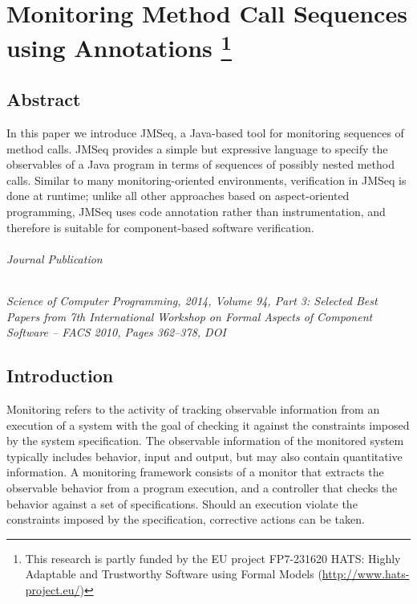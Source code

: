 
\chapter[Monitoring Method Call Sequences using Annotations]{Monitoring Method Call Sequences using Annotations%
\footnote{This research is partly funded by the EU project FP7-231620 HATS: Highly Adaptable and Trustworthy Software using Formal Models (\url{http://www.hats-project.eu/})}
}
% 
\label{ch:p03:ch02}
% 
% 

\section*{Abstract}
In this paper we introduce JMSeq, a Java-based tool for 
monitoring  sequences of
method calls. JMSeq provides a simple but expressive language
to specify the observables of  a Java program in terms of sequences of possibly nested method calls. 
Similar to many
monitoring-oriented environments, verification in JMSeq is done
at runtime; unlike all other approaches based on
aspect-oriented programming, JMSeq uses code
annotation rather than instrumentation,
and therefore is suitable for component-based software verification.

\subparagraph*{Journal Publication}
\emph{Science of Computer Programming, 2014, Volume 94, Part 3: Selected Best Papers from 7th International Workshop on Formal Aspects of Component Software -- FACS 2010, Pages 362--378, DOI }


 \section{Introduction} \label{sec:intro}
Monitoring refers to the activity of tracking observable information from an
execution of a system with the goal of checking it against the constraints imposed
by the system specification. The observable information of the monitored system
typically includes behavior, input and output, but may also contain quantitative
information. A monitoring framework consists of a monitor that extracts the
observable behavior from a program execution, and a controller that checks the
behavior against a set of specifications. Should an execution
violate the constraints imposed by the specification, corrective
actions can be taken.

